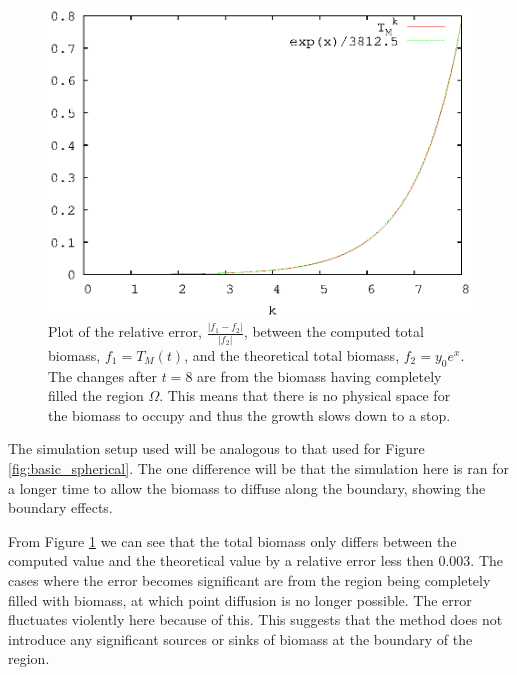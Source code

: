 \begin{figure}[!htp]
  \centering
  \includegraphics[scale = 0.9]{basic_growth}
  \caption{Plot of the relative error, $\frac{|f_1 - f_2|}{|f_2|}$, between the computed total biomass, $f_1 = T_{M}(t)$, and the theoretical total biomass, $f_2 = y_0 e^x$. 
    The changes after $t = 8$ are from the biomass having completely filled the region $\Omega$.
    This means that there is no physical space for the biomass to occupy and thus the growth slows down to a stop.}
  \label{fig:basic_growth}
\end{figure}

The simulation setup used will be analogous to that used for Figure \ref{fig:basic_spherical}.
The one difference will be that the simulation here is ran for a longer time to allow the biomass to diffuse along the boundary, showing the boundary effects.

From Figure \ref{fig:basic_growth} we can see that the total biomass only differs between the computed value and the theoretical value by a relative error less then $0.003$.
The cases where the error becomes significant are from the region being completely filled with biomass, at which point diffusion is no longer possible.
The error fluctuates violently here because of this.
This suggests that the method does not introduce any significant sources or sinks of biomass at the boundary of the region.

